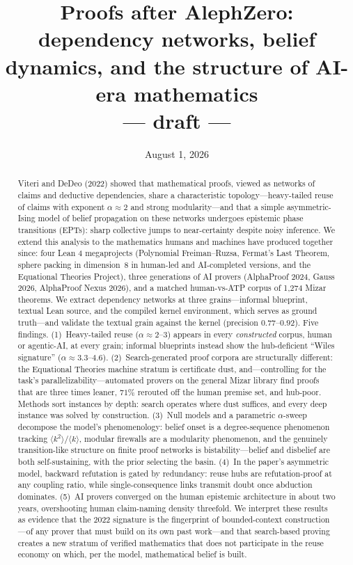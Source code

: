 \documentclass[11pt]{article}
\title{Proofs after AlephZero:\\ dependency networks, belief dynamics, and the structure of
AI-era mathematics\\[0.6em]\large --- draft ---}
\author{}
\date{August 1, 2026}
\newcommand{\kk}{\langle k^{2}\rangle/\langle k\rangle}
\begin{document}
\maketitle

\begin{abstract}
Viteri and DeDeo (2022) showed that mathematical proofs, viewed as networks of claims and
deductive dependencies, share a characteristic topology---heavy-tailed reuse of claims with
exponent $\alpha\!\approx\!2$ and strong modularity---and that a simple asymmetric-Ising model of
belief propagation on these networks undergoes epistemic phase transitions (EPTs): sharp
collective jumps to near-certainty despite noisy inference. We extend this analysis to the
mathematics humans and machines have produced together since: four Lean 4 megaprojects
(Polynomial Freiman--Ruzsa, Fermat's Last Theorem, sphere packing in dimension~8 in human-led and
AI-completed versions, and the Equational Theories Project), three generations of AI provers
(AlphaProof 2024, Gauss 2026, AlphaProof Nexus 2026), and a matched human-vs-ATP corpus of 1{,}274
Mizar theorems. We extract dependency networks at three grains---informal blueprint, textual
Lean source, and the compiled kernel environment, which serves as ground truth---and validate the
textual grain against the kernel (precision $0.77$--$0.92$). Five findings. (1)~Heavy-tailed
reuse ($\alpha\!\approx\!2$--$3$) appears in every \emph{constructed} corpus, human or agentic-AI,
at every grain; informal blueprints instead show the hub-deficient ``Wiles signature''
($\alpha\!\approx\!3.3$--$4.6$). (2)~Search-generated proof corpora are structurally different:
the Equational Theories machine stratum is certificate dust, and---controlling for the task's
parallelizability---automated provers on the general Mizar library find proofs that are
three times leaner, $71\%$ rerouted off the human premise set, and hub-poor. Methods sort
instances by depth: search operates where dust suffices, and every deep instance was solved by
construction. (3)~Null models and a parametric $\alpha$-sweep decompose the model's
phenomenology: belief onset is a degree-sequence phenomenon tracking $\kk$, modular firewalls are
a modularity phenomenon, and the genuinely transition-like structure on finite proof networks is
bistability---belief and disbelief are both self-sustaining, with the prior selecting the basin.
(4)~In the paper's asymmetric model, backward refutation is gated by redundancy: reuse hubs are
refutation-proof at any coupling ratio, while single-consequence links transmit doubt once
abduction dominates. (5)~AI provers converged on the human epistemic architecture in about two
years, overshooting human claim-naming density threefold. We interpret these results as evidence
that the 2022 signature is the fingerprint of bounded-context construction---of any prover that
must build on its own past work---and that search-based proving creates a new stratum of
verified mathematics that does not participate in the reuse economy on which, per the model,
mathematical belief is built.
\end{abstract}
\end{document}
